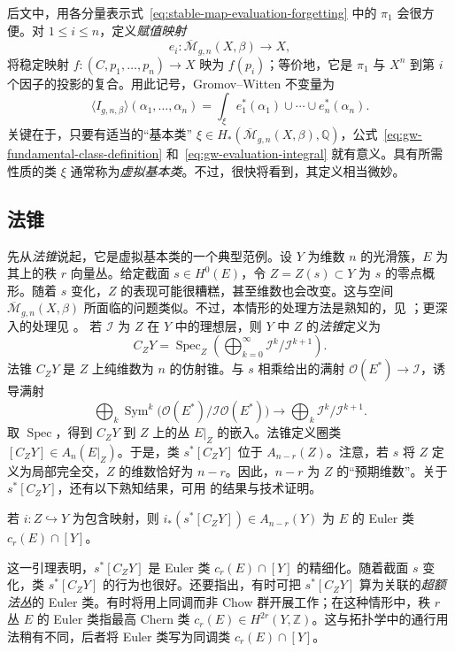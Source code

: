 后文中，用各分量表示式~\eqref{eq:stable-map-evaluation-forgetting} 中的 $\pi_1$ 会很方便。对 $1\leq i\leq n$，定义\emph{赋值映射}
\[
e_i:\overline{\mathcal M}_{g,n}(X,\beta)\longrightarrow X,
\]
将稳定映射 $f:(C,p_1,\ldots,p_n)\to X$ 映为 $f(p_i)$；等价地，它是 $\pi_1$ 与 $X^n$ 到第 $i$ 个因子的投影的复合。用此记号，Gromov--Witten 不变量为
\begin{equation}\label{eq:gw-evaluation-integral}
\langle I_{g,n,\beta}\rangle(\alpha_1,\ldots,\alpha_n)
=\int_\xi e_1^*(\alpha_1)\cup\cdots\cup e_n^*(\alpha_n).
\end{equation}
关键在于，只要有适当的“基本类”
$\xi\in H_*(\overline{\mathcal M}_{g,n}(X,\beta),\mathbb Q)$，公式~\eqref{eq:gw-fundamental-class-definition} 和~\eqref{eq:gw-evaluation-integral} 就有意义。具有所需性质的类 $\xi$ 通常称为\emph{虚拟基本类}。不过，很快将看到，其定义相当微妙。

\subsection{法锥}\label{subsec:normal-cone}
先从\emph{法锥}说起，它是虚拟基本类的一个典型范例。设 $Y$ 为维数 $n$ 的光滑簇，$E$ 为其上的秩 $r$ 向量丛。给定截面 $s\in H^0(E)$，令 $Z=Z(s)\subset Y$ 为 $s$ 的零点概形。随着 $s$ 变化，$Z$ 的表现可能很糟糕，甚至维数也会改变。这与空间 $\overline{\mathcal M}_{g,n}(X,\beta)$ 所面临的问题类似。不过，本情形的处理方法是熟知的，见 ；更深入的处理见 。
若 $\mathcal I$ 为 $Z$ 在 $Y$ 中的理想层，则 $Y$ 中 $Z$ 的\emph{法锥}定义为
\begin{equation}\label{eq:normal-cone-definition}
C_ZY=\operatorname{Spec}_Z\left(\bigoplus_{k=0}^\infty
\mathcal I^k/\mathcal I^{k+1}\right).
\end{equation}
法锥 $C_ZY$ 是 $Z$ 上纯维数为 $n$ 的仿射锥。与 $s$ 相乘给出的满射
$\mathcal O(E^*)\to\mathcal I$，诱导满射
\[
\bigoplus_k\operatorname{Sym}^k
\bigl(\mathcal O(E^*)/\mathcal I\mathcal O(E^*)\bigr)
\longrightarrow\bigoplus_k\mathcal I^k/\mathcal I^{k+1}.
\]
取 $\operatorname{Spec}$，得到 $C_ZY$ 到 $Z$ 上的丛 $E|_Z$ 的嵌入。法锥定义圈类
$[C_ZY]\in A_n(E|_Z)$。于是，类 $s^*[C_ZY]$ 位于 $A_{n-r}(Z)$。注意，若 $s$ 将 $Z$ 定义为局部完全交，$Z$ 的维数恰好为 $n-r$。因此，$n-r$ 为 $Z$ 的“预期维数”。关于 $s^*[C_ZY]$，还有以下熟知结果，可用  的结果与技术证明。

\begin{lemma}\label{lem:normal-cone-euler-class}
若 $i:Z\hookrightarrow Y$ 为包含映射，则
$i_*(s^*[C_ZY])\in A_{n-r}(Y)$ 为 $E$ 的 Euler 类 $c_r(E)\cap[Y]$。
\end{lemma}
这一引理表明，$s^*[C_ZY]$ 是 Euler 类 $c_r(E)\cap[Y]$ 的精细化。随着截面 $s$ 变化，类 $s^*[C_ZY]$ 的行为也很好。还要指出，有时可把 $s^*[C_ZY]$ 算为关联的\emph{超额法丛}的 Euler 类。有时将用上同调而非 Chow 群开展工作；在这种情形中，秩 $r$ 丛 $E$ 的 Euler 类指最高 Chern 类 $c_r(E)\in H^{2r}(Y,\mathbb Z)$。这与拓扑学中的通行用法稍有不同，后者将 Euler 类写为同调类 $c_r(E)\cap[Y]$。

